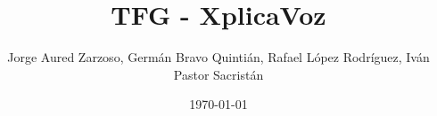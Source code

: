 \documentclass{article}
\title{TFG - XplicaVoz}
\author{\parbox{.7\textwidth}{\centering Jorge Aured Zarzoso, Germán Bravo Quintián, Rafael López Rodríguez, Iván Pastor Sacristán}}
\date{\today}
\begin{document}
\maketitle

\begin{justify}

\tableofcontents


\newpage













\end{justify}



\end{document}

